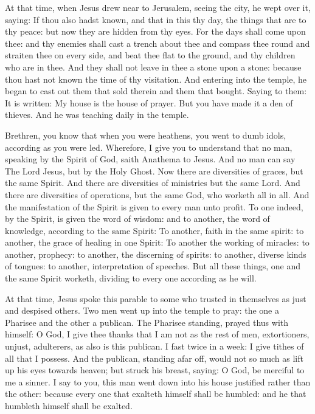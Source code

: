 
At that time, when Jesus drew near to Jerusalem, seeing the city, he wept over it, saying:
If thou also hadst known, and that in this thy day, the things
that are to thy peace: but now they are hidden from thy eyes.
For the days shall come upon thee: and thy enemies shall cast a
trench about thee and compass thee round and straiten thee on every
side,
and beat thee flat to the ground, and thy children who are in
thee. And they shall not leave in thee a stone upon a stone: because
thou hast not known the time of thy visitation.
And entering into the temple, he began to cast out them that sold
therein and them that bought.
Saying to them: It is written: My house is the house of prayer.
But you have made it a den of thieves.
And he was teaching daily in the temple. %






Brethren, you know that when you were heathens, you went to dumb idols,
according as you were led.
Wherefore, I give you to understand that no man, speaking by the
Spirit of God, saith Anathema to Jesus. And no man can say The Lord
Jesus, but by the Holy Ghost.
Now there are diversities of graces, but the same Spirit.
And there are diversities of ministries but the same Lord.
And there are diversities of operations, but the same God, who
worketh all in all.
And the manifestation of the Spirit is given to every man unto
profit.
To one indeed, by the Spirit, is given the word of wisdom: and to
another, the word of knowledge, according to the same Spirit:
To another, faith in the same spirit: to another, the grace of
healing in one Spirit:
To another the working of miracles: to another, prophecy: to
another, the discerning of spirits: to another, diverse kinds of
tongues: to another, interpretation of speeches.
But all these things, one and the same Spirit worketh, dividing
to every one according as he will.



At that time, Jesus spoke this parable to some who trusted in themselves as just and despised others.
Two men went up into the temple to pray: the one a Pharisee and
the other a publican.
The Pharisee standing, prayed thus with himself: O God, I give
thee thanks that I am not as the rest of men, extortioners, unjust,
adulterers, as also is this publican.
I fast twice in a week: I give tithes of all that I possess.
And the publican, standing afar off, would not so much as lift up
his eyes towards heaven; but struck his breast, saying: O God, be
merciful to me a sinner.
I say to you, this man went down into his house justified rather
than the other: because every one that exalteth himself shall be
humbled: and he that humbleth himself shall be exalted.


